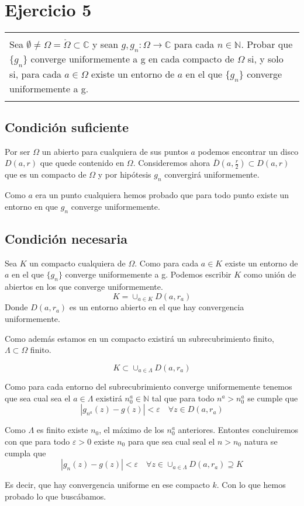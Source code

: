 \documentclass[12pt]{article}
\newenvironment{micaja}
{
    \begin{center}
    \begin{tabular}{|p{0.9\textwidth}|}
    \hline\\
    }   
    {   
    \\\\\hline
    \end{tabular} 
    \end{center}
    }
\begin{document}
\newpage


\section{Ejercicio 5}

\begin{micaja}
    
    Sea $\emptyset \neq \Omega = \mathring{\Omega} \subset \mathbb C$ y sean $g,g_n:\Omega \rightarrow \mathbb C$ para cada $n\in \mathbb N.$
    Probar que $\{g_n\}$ converge uniformemente a g en cada compacto de $\Omega$ si, y solo si, para cada $a \in \Omega$ existe
    un entorno de $a$ en el que $\{g_n\}$ converge uniformemente a g.
\end{micaja}
\subsection{Condición suficiente}
Por ser $\Omega$ un abierto para cualquiera de sus puntos $a$ podemos encontrar un disco $D(a,r)$ que quede contenido en $\Omega.$
Consideremos ahora $\bar D (a,\frac{r}{2}) \subset D(a,r)$  que es un compacto de $\Omega$ y por hipótesis ${g_n}$ convergirá
uniformemente.

Como $a$ era un punto cualquiera hemos probado que para todo punto existe un entorno en que 
${g_n}$ converge uniformemente.

\subsection{Condición necesaria}
Sea $K$ un compacto cualquiera de $\Omega.$
Como para cada $a \in K$ existe un entorno de $a$ en el que $\{g_n\}$ converge uniformemente a g.
Podemos escribir $K$ como unión de abiertos en los que converge uniformemente.
$$K= \cup_{ a \in K} D(a,r_a)$$ 
Donde $D(a,r_a)$ es un entorno abierto en el que hay convergencia uniformemente.

Como además estamos en un compacto existirá un subrecubrimiento finito, 
$\Lambda \subset \Omega$ finito. 

$$K \subset \cup_{ a \in \Lambda} D(a,r_{a})$$ 

Como para cada entorno del subrecubrimiento converge uniformemente tenemos que sea cual sea el 
$a\in \Lambda$
existirá $n_0^{a}  \in \mathbb N$ tal que para todo $n^a>n_0^a$  se cumple que
$$|g_{n^a}(z) - g(z)|< \varepsilon \quad \forall z \in D(a,r_a)$$

Como $\Lambda$ es finito existe $n_0$, el  máximo de los $n_0^a$ anteriores. Entontes concluiremos con que
para todo $\varepsilon >0$ existe $n_0$ para que sea cual seal el $n>n_0$ natura se cumpla que
$$|g_{n}(z) - g(z)|< \varepsilon \quad \forall z \in \cup_{ a \in \Lambda} D(a,r_a) \supseteq K$$

Es decir, que hay convergencia uniforme en ese compacto $k$.
Con lo que hemos probado lo que buscábamos. 
\end{document}

